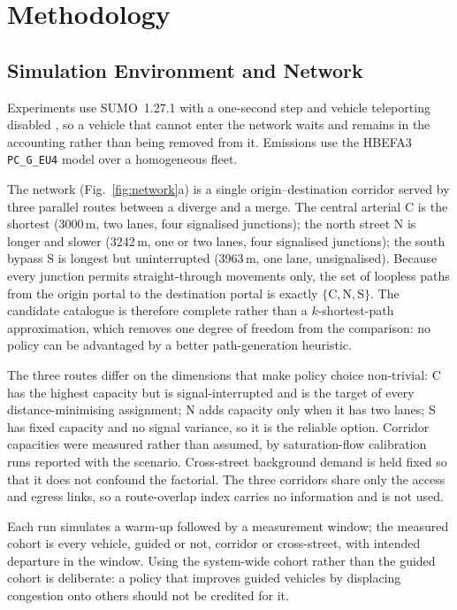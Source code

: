 
\section{Methodology}
\label{sec:method}

\subsection{Simulation Environment and Network}
\label{sec:method:net}

Experiments use SUMO~1.27.1 with a one-second step and vehicle teleporting
disabled \citep{lopez2018sumo}, so a vehicle that cannot enter the network waits
and remains in the accounting rather than being removed from it. Emissions use
the HBEFA3 \texttt{PC\_G\_EU4} model \citep{krajzewicz2015emissions} over a
homogeneous fleet.

The network (Fig.~\ref{fig:network}a) is a single origin--destination corridor
served by three parallel routes between a diverge and a merge. The central
arterial C is the shortest (3000\,m, two lanes, four signalised junctions); the
north street N is longer and slower (3242\,m, one or two lanes, four signalised
junctions); the south bypass S is longest but uninterrupted (3963\,m, one lane,
unsignalised). Because every junction permits straight-through movements only,
the set of loopless paths from the origin portal to the destination portal is
exactly $\{\mathrm{C},\mathrm{N},\mathrm{S}\}$. The candidate catalogue is
therefore complete rather than a $k$-shortest-path approximation, which removes
one degree of freedom from the comparison: no policy can be advantaged by a
better path-generation heuristic.

The three routes differ on the dimensions that make policy choice non-trivial:
C has the highest capacity but is signal-interrupted and is the target of every
distance-minimising assignment; N adds capacity only when it has two lanes; S
has fixed capacity and no signal variance, so it is the reliable option. Corridor
capacities were measured rather than assumed, by saturation-flow calibration runs
reported with the scenario. Cross-street background demand is held fixed so that
it does not confound the factorial. The three corridors share only the access and
egress links, so a route-overlap index carries no information and is not used.

Each run simulates a warm-up followed by a measurement window; the measured
cohort is every vehicle, guided or not, corridor or cross-street, with intended
departure in the window. Using the system-wide cohort rather than the guided
cohort is deliberate: a policy that improves guided vehicles by displacing
congestion onto others should not be credited for it.

